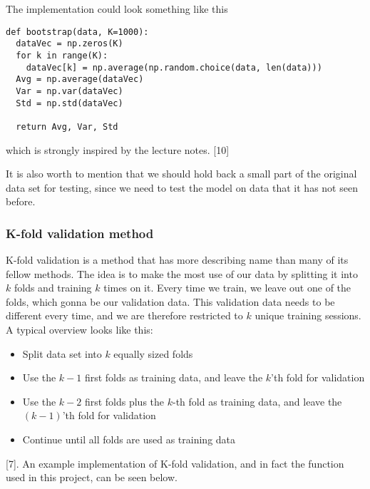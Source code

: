 The implementation could look something like this
\lstset{basicstyle=\scriptsize}
\begin{lstlisting}
def bootstrap(data, K=1000):
  dataVec = np.zeros(K)
  for k in range(K):
    dataVec[k] = np.average(np.random.choice(data, len(data)))
  Avg = np.average(dataVec)
  Var = np.var(dataVec)
  Std = np.std(dataVec)
    
  return Avg, Var, Std
\end{lstlisting}
which is strongly inspired by the lecture notes. [10]

It is also worth to mention that we should hold back a small part of the original data set for testing, since we need to test the model on data that it has not seen before.

\subsubsection{K-fold validation method} \label{sec:kfold}
K-fold validation is a method that has more describing name than many of its fellow methods. The idea is to make the most use of our data by splitting it into $k$ folds and training $k$ times on it. Every time we train, we leave out one of the folds, which gonna be our validation data. This validation data needs to be different every time, and we are therefore restricted to $k$ unique training sessions. A typical overview looks like this:
\begin{itemize}
	\item Split data set into $k$ equally sized folds
	\item Use the $k-1$ first folds as training data, and leave the $k$'th fold for validation
	\item Use the $k-2$ first folds plus the $k$-th fold as training data, and leave the $(k-1)$'th fold for validation
	\item Continue until all folds are used as training data
\end{itemize}
[7]. An example implementation of K-fold validation, and in fact the function used in this project, can be seen below.

